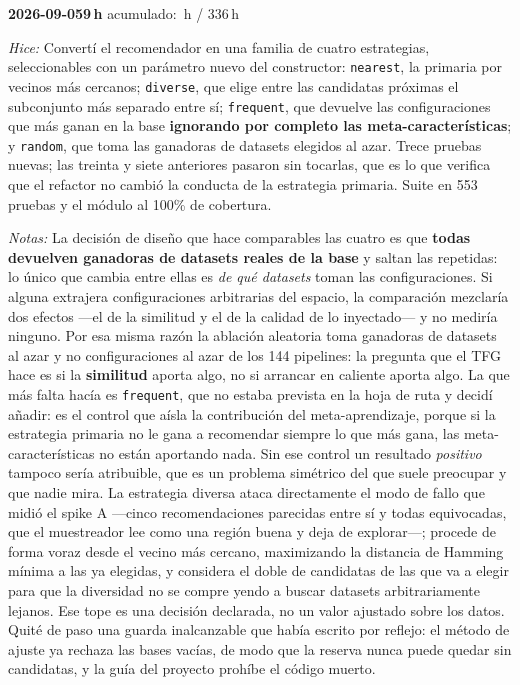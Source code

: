 \documentclass[11pt,letterpaper]{article}
\newcommand{\presupuesto}{336}
\newcommand{\horasacum}{0}
\newcommand{\entrada}[4]{%
  \xdef\horasacum{\fpeval{\horasacum + #2}}%
  \par\medskip
  \noindent\textbf{\color{tecnavy}#1}\quad\textbf{#2\,h}%
  \hfill{\small\color{gris}acumulado: \horasacum\,h / \presupuesto\,h}\par
  \nopagebreak
  \noindent\textit{Hice:} #3\par
  \nopagebreak
  \noindent\textit{Notas:} #4\par
}
\begin{document}
\entrada{2026-09-05}{9}
{Convertí el recomendador en una familia de cuatro estrategias, seleccionables con un
 parámetro nuevo del constructor: \texttt{nearest}, la primaria por vecinos más cercanos;
 \texttt{diverse}, que elige entre las candidatas próximas el subconjunto más separado
 entre sí; \texttt{frequent}, que devuelve las configuraciones que más ganan en la base
 \textbf{ignorando por completo las meta-características}; y \texttt{random}, que toma las
 ganadoras de datasets elegidos al azar. Trece pruebas nuevas; las treinta y siete
 anteriores pasaron sin tocarlas, que es lo que verifica que el refactor no cambió la
 conducta de la estrategia primaria. Suite en 553 pruebas y el módulo al 100\% de
 cobertura.}
{La decisión de diseño que hace comparables las cuatro es que \textbf{todas devuelven
 ganadoras de datasets reales de la base} y saltan las repetidas: lo único que cambia entre
 ellas es \emph{de qué datasets} toman las configuraciones. Si alguna extrajera
 configuraciones arbitrarias del espacio, la comparación mezclaría dos efectos —el de la
 similitud y el de la calidad de lo inyectado— y no mediría ninguno. Por esa misma razón la
 ablación aleatoria toma ganadoras de datasets al azar y no configuraciones al azar de los
 144 pipelines: la pregunta que el TFG hace es si la \textbf{similitud} aporta algo, no si
 arrancar en caliente aporta algo. La que más falta hacía es \texttt{frequent}, que no
 estaba prevista en la hoja de ruta y decidí añadir: es el control que aísla la
 contribución del meta-aprendizaje, porque si la estrategia primaria no le gana a
 recomendar siempre lo que más gana, las meta-características no están aportando nada. Sin
 ese control un resultado \emph{positivo} tampoco sería atribuible, que es un problema
 simétrico del que suele preocupar y que nadie mira. La estrategia diversa ataca
 directamente el modo de fallo que midió el spike A —cinco recomendaciones parecidas entre
 sí y todas equivocadas, que el muestreador lee como una región buena y deja de explorar—;
 procede de forma voraz desde el vecino más cercano, maximizando la distancia de Hamming
 mínima a las ya elegidas, y considera el doble de candidatas de las que va a elegir para
 que la diversidad no se compre yendo a buscar datasets arbitrariamente lejanos. Ese tope
 es una decisión declarada, no un valor ajustado sobre los datos. Quité de paso una guarda
 inalcanzable que había escrito por reflejo: el método de ajuste ya rechaza las bases
 vacías, de modo que la reserva nunca puede quedar sin candidatas, y la guía del proyecto
 prohíbe el código muerto.}
\end{document}
